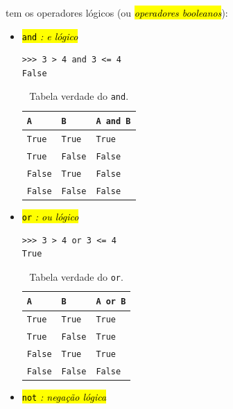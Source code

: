 {\python} tem os operadores lógicos (ou \hl{\emph{operadores booleanos}}):
\begin{itemize}
\item \hl{{\lstinline+and+} \emph{: e lógico}}

\begin{lstlisting}
>>> 3 > 4 and 3 <= 4
False
\end{lstlisting}

  \begin{table}[H]
    \centering
    \caption{Tabela verdade do \lstinline+and+.}
    \begin{tabular}{ll|l}
      {\lstinline+A+} & {\lstinline+B+} & {\lstinline+A and B+}\\\hline
      {\lstinline+True+} & {\lstinline+True+} & {\lstinline+True+}\\
      {\lstinline+True+} & {\lstinline+False+} & {\lstinline+False+}\\
      {\lstinline+False+} & {\lstinline+True+} & {\lstinline+False+}\\
      {\lstinline+False+} & {\lstinline+False+} & {\lstinline+False+}\\\hline
    \end{tabular}
  \end{table}

\item \hl{{\lstinline+or+} \emph{: ou lógico}}

\begin{lstlisting}
>>> 3 > 4 or 3 <= 4
True
\end{lstlisting}

  \begin{table}[H]
    \centering
    \caption{Tabela verdade do \lstinline+or+.}
    \begin{tabular}{ll|l}
      {\lstinline+A+}     & {\lstinline+B+}     & {\lstinline+A or B+} \\\hline
      {\lstinline+True+}  & {\lstinline+True+}  & {\lstinline+True+} \\
      {\lstinline+True+}  & {\lstinline+False+} & {\lstinline+True+} \\
      {\lstinline+False+} & {\lstinline+True+ } & {\lstinline+True+} \\
      {\lstinline+False+} & {\lstinline+False+} & {\lstinline+False+} \\\hline
    \end{tabular}
  \end{table}

\item \hl{{\lstinline+not+} \emph{: negação lógica}}


\end{itemize}
